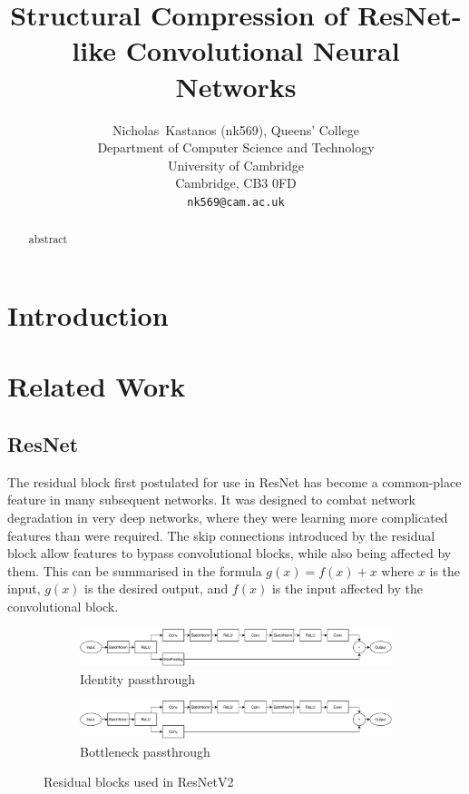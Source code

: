 \documentclass{article}
\title{Structural Compression of ResNet-like Convolutional Neural Networks}
\author{%
	Nicholas~Kastanos (nk569), Queens' College \\
	Department of Computer Science and Technology\\
	University of Cambridge\\
	Cambridge, CB3 0FD\\
	\texttt{nk569@cam.ac.uk} \\
}
\begin{document}
	
	\maketitle
	
	\begin{abstract}
		abstract
	\end{abstract}
	
	\section{Introduction}
	
	
	
	
	\section{Related Work}
	\subsection{ResNet}
	
	The residual block first postulated for use in ResNet has become a common-place feature in many subsequent networks. %
	It was designed to combat network degradation in very deep networks, where they were learning more complicated features than were required. The skip connections introduced by the residual block allow features to bypass convolutional blocks, while also being affected by them. This can be summarised in the formula $g(x) = f(x) + x$ where $x$ is the input, $g(x)$ is the desired output, and $f(x)$ is the input affected by the convolutional block.
	
	\begin{figure}[b!]
		\centering
		\begin{subfigure}[b]{\textwidth}
			\centering
			\includegraphics[width=\textwidth]{images/identity_base.pdf}
			\caption{Identity passthrough}
			\label{fig:resnet-identity}
		\end{subfigure}
		\vfill
		\begin{subfigure}[b]{\textwidth}
			\centering
			\includegraphics[width=\textwidth]{images/bottleneck_base.pdf}
			\caption{Bottleneck passthrough}
			\label{fig:resnet-bottleneck}
		\end{subfigure}
		\caption{Residual blocks used in ResNetV2}
		\label{fig:resnet}
	\end{figure}
	
\end{document}
